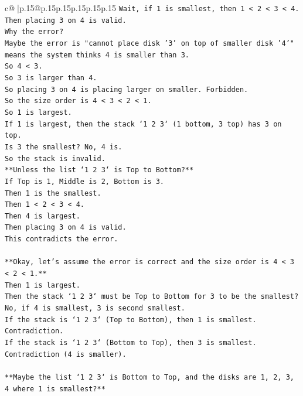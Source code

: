 \documentclass{article}
\begin{document}
{\begin{supertabular}{c@{$\;$}|p{.15\linewidth}@{}p{.15\linewidth}p{.15\linewidth}p{.15\linewidth}p{.15\linewidth}p{.15\linewidth}}
{{{\texttt{Wait, if 1 is smallest, then 1 < 2 < 3 < 4.} \\
\texttt{Then placing 3 on 4 is valid.} \\
\texttt{Why the error?} \\
\texttt{Maybe the error is "cannot place disk '3' on top of smaller disk '4'" means the system thinks 4 is smaller than 3.} \\
\texttt{So 4 < 3.} \\
\texttt{So 3 is larger than 4.} \\
\texttt{So placing 3 on 4 is placing larger on smaller. Forbidden.} \\
\texttt{So the size order is 4 < 3 < 2 < 1.} \\
\texttt{So 1 is largest.} \\
\texttt{If 1 is largest, then the stack `1 2 3` (1 bottom, 3 top) has 3 on top.} \\
\texttt{Is 3 the smallest? No, 4 is.} \\
\texttt{So the stack is invalid.} \\
\texttt{**Unless the list `1 2 3` is Top to Bottom?**} \\
\texttt{If Top is 1, Middle is 2, Bottom is 3.} \\
\texttt{Then 1 is the smallest.} \\
\texttt{Then 1 < 2 < 3 < 4.} \\
\texttt{Then 4 is largest.} \\
\texttt{Then placing 3 on 4 is valid.} \\
\texttt{This contradicts the error.} \\
\\ 
\texttt{**Okay, let's assume the error is correct and the size order is 4 < 3 < 2 < 1.**} \\
\texttt{Then 1 is largest.} \\
\texttt{Then the stack `1 2 3` must be Top to Bottom for 3 to be the smallest?} \\
\texttt{No, if 4 is smallest, 3 is second smallest.} \\
\texttt{If the stack is `1 2 3` (Top to Bottom), then 1 is smallest.} \\
\texttt{Contradiction.} \\
\texttt{If the stack is `1 2 3` (Bottom to Top), then 3 is smallest.} \\
\texttt{Contradiction (4 is smaller).} \\
\\ 
\texttt{**Maybe the list `1 2 3` is Bottom to Top, and the disks are 1, 2, 3, 4 where 1 is smallest?**} \\
}}}
\end{supertabular}}
\end{document}
